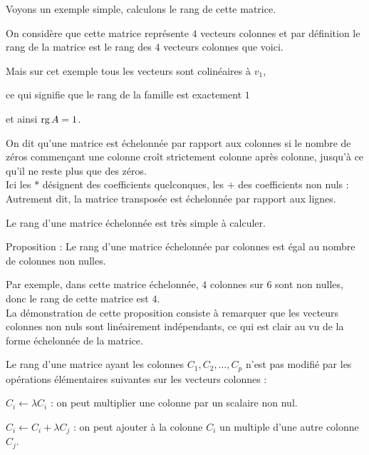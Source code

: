 \change
Voyons un exemple simple, calculons le rang de cette matrice.

\change

On considère que cette matrice représente $4$ vecteurs colonnes
et par définition le rang de la matrice est le rang
des $4$ vecteurs colonnes que voici.

\change
Mais sur cet exemple tous les vecteurs sont colinéaires à $v_1$, 

\change
ce qui signifie que le rang de la famille est exactement $1$ 

\change
et ainsi $\mathop{\text{rg}}\nolimits A = 1$.



\diapo

On dit qu'une matrice est échelonnée par rapport aux colonnes si
le nombre de zéros commençant une colonne croît strictement colonne après colonne,
jusqu'à ce qu'il ne reste plus que des zéros.\\

Ici les $*$ désignent des coefficients quelconques, les $+$ des coefficients non nuls :\\

Autrement dit, la matrice transposée est échelonnée par rapport aux lignes.

Le rang d'une matrice échelonnée est très simple à calculer.

Proposition : Le rang d'une matrice échelonnée par colonnes est égal au nombre
de colonnes non nulles.

Par exemple, dans cette matrice échelonnée, $4$ colonnes sur $6$ sont non nulles, donc le rang 
de cette matrice est $4$.\\

La démonstration de cette proposition consiste à remarquer que
les vecteurs colonnes non nuls sont linéairement indépendants, 
ce qui est clair au vu de la forme échelonnée de la matrice.



\diapo

Le rang d'une matrice ayant les colonnes $C_1, C_2, \ldots, C_p$
n'est pas modifié par les opérations élémentaires suivantes sur les 
vecteurs colonnes :

\change
$C_i \leftarrow \lambda C_i$ : 
  on peut multiplier une colonne par un scalaire non nul.

\change
$C_i \leftarrow C_i+\lambda C_j$ :
  on peut ajouter à la colonne $C_i$ un multiple d'une autre colonne $C_j$.

